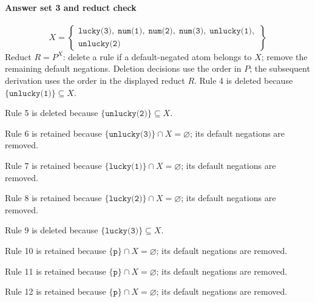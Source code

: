 \documentclass[a4paper,11pt]{article}
\newcommand{\at}[1]{\texttt{#1}}
\begin{document}
\paragraph{Answer set 3 and reduct check}
\[
X=\left\{\begin{gathered}\at{lucky(3)},\;\at{num(1)},\;\at{num(2)},\;\at{num(3)},\;\at{unlucky(1)},\\\at{unlucky(2)}\end{gathered}\right\}
\]
Reduct $R=P^X$: delete a rule if a default-negated atom belongs to $X$; remove the remaining default negations. Deletion decisions use the order in $P$; the subsequent derivation uses the order in the displayed reduct $R$.
Rule 4 is deleted because $\{\at{unlucky(1)}\}\subseteq X$.

Rule 5 is deleted because $\{\at{unlucky(2)}\}\subseteq X$.

Rule 6 is retained because $\{\at{unlucky(3)}\}\cap X=\varnothing$; its default negations are removed.

Rule 7 is retained because $\{\at{lucky(1)}\}\cap X=\varnothing$; its default negations are removed.

Rule 8 is retained because $\{\at{lucky(2)}\}\cap X=\varnothing$; its default negations are removed.

Rule 9 is deleted because $\{\at{lucky(3)}\}\subseteq X$.

Rule 10 is retained because $\{\at{p}\}\cap X=\varnothing$; its default negations are removed.

Rule 11 is retained because $\{\at{p}\}\cap X=\varnothing$; its default negations are removed.

Rule 12 is retained because $\{\at{p}\}\cap X=\varnothing$; its default negations are removed.
\end{document}
